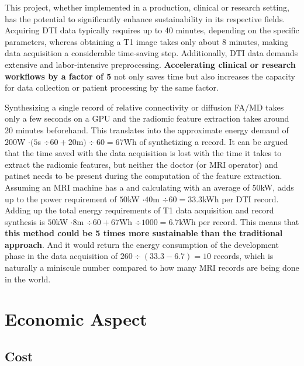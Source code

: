 This project, whether implemented in a production, clinical or research setting, has the potential to significantly enhance sustainability in its respective fields. Acquiring \ac{DTI} data typically requires up to 40 minutes, depending on the specific parameters, whereas obtaining a T1 image takes only about 8 minutes, making data acquisition a considerable time-saving step. Additionally, \ac{DTI} data demands extensive and labor-intensive preprocessing. \textbf{Accelerating clinical or research workflows by a factor of 5} not only saves time but also increases the capacity for data collection or patient processing by the same factor.\par
Synthesizing a single record of relative connectivity or diffusion \ac{FA}/\ac{MD} takes only a few seconds on a GPU and the radiomic feature extraction takes around 20 minutes beforehand. This translates into the approximate energy demand of $200$W $ \cdot (5$s $ \div 60 + 20$m$) \div 60 = 67$Wh of synthetizing a record. It can be argued that the time saved with the data acquisition is lost with the time it takes to extract the radiomic features, but neither the doctor (or MRI operator) and patinet needs to be present during the computation of the feature extraction. Assuming an MRI machine has a  and calculating with an average of $50$kW, adds up to the power requirement of $50$kW $ \cdot 40$m $ \div 60 = 33.3$kWh per \ac{DTI} record. Adding up the total energy requirements of T1 data acquisition and record synthesis is $50$kW $ \cdot 8$m $ \div 60 + 67$Wh $ \div 1000 = 6.7$kWh per record. This means that \textbf{this method could be 5 times more sustainable than the traditional approach}. And it would return the energy consumption of the development phase in the data acquisition of $260 \div (33.3 - 6.7) = 10$ records, which is naturally a miniscule number compared to how many MRI records are being done in the world.

\section{Economic Aspect}

\subsection{Cost}

